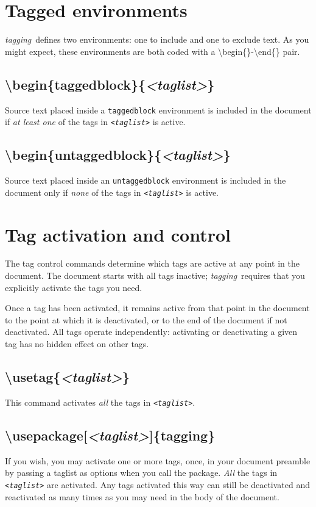 \documentclass[a4paper,12pt,twoside,openany]{memoir}
\newcommand{\tpn}{tagging}
\newcommand{\tpname}{\textsf{\itshape \tpn}}
\begin{document}
\section{Tagged environments}
\tpname\ defines two environments: one to include and one to exclude text.
As you might expect, these environments are both coded with a
{\ttfamily\textbackslash begin\{\}}-{\ttfamily\textbackslash end\{\}} pair.
\subsection{{\ttfamily\textbackslash begin\{taggedblock\}\{{\itshape<taglist>}\}}}
Source text placed inside a \texttt{taggedblock} environment
is included in the document if \emph{at least one} of the tags in
\texttt{\itshape<taglist>} is active.
\subsection{{\ttfamily\textbackslash begin\{untaggedblock\}\{{\itshape<taglist>}\}}}
Source text placed inside an \texttt{untaggedblock} environment
is included in the document only if \emph{none} of the tags in
\texttt{\itshape<taglist>} is active.

\section{Tag activation and control}
The tag control commands determine which tags
are active at any point in the document.
The document starts with all tags inactive;
\tpname\ requires that you explicitly activate 
the tags you need.

Once a tag has been activated, it remains active from that point
in the document to the point at which it is deactivated,
or to the end of the document if not deactivated.
All tags operate independently:
activating or deactivating a given tag has no hidden effect on other tags.

\subsection{{\ttfamily\textbackslash usetag\{{\itshape<taglist>}\}}}
This command activates \emph{all} the tags in \texttt{\itshape<taglist>}.
\subsection{{\ttfamily\textbackslash usepackage[{\itshape<taglist>}]\{\tpn\}}}
If you wish, you may activate one or more tags, once, in your
document preamble by passing a taglist as options when you call
the package. 
\emph{All} the tags in \texttt{\itshape<taglist>} are activated.
Any tags activated this way can still be deactivated and
reactivated as many times as you may need in the body of the
document.
\end{document}
